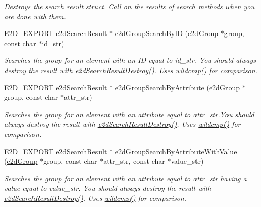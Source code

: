 \begin{DoxyCompactItemize}
\begin{DoxyCompactList}\small\item\em Destroys the search result struct. Call on the results of search methods when you are done with them. \end{DoxyCompactList}\item 
\hyperlink{Ez2DS_8h_a9f14e9cb869e1a85fdaba03afcca0df9}{E2\-D\-\_\-\-E\-X\-P\-O\-R\-T} \hyperlink{structe2dSearchResult}{e2d\-Search\-Result} $\ast$ \hyperlink{group__e2dGroup_ga0c495948b5e2e14d004d1daacf4811af}{e2d\-Group\-Search\-By\-I\-D} (\hyperlink{structe2dGroup}{e2d\-Group} $\ast$group, const char $\ast$id\-\_\-str)
\begin{DoxyCompactList}\small\item\em Searches the group for an element with an I\-D equal to id\-\_\-str. You should always destroy the result with \hyperlink{group__e2dGroup_ga0775c9a7e2ec5311263f84339afb52bc}{e2d\-Search\-Result\-Destroy()}. Uses \hyperlink{Ez2DS_8h_a64615e3e2147eb59622dbbe4f7af2e5f}{wildcmp()} for comparison. \end{DoxyCompactList}\item 
\hyperlink{Ez2DS_8h_a9f14e9cb869e1a85fdaba03afcca0df9}{E2\-D\-\_\-\-E\-X\-P\-O\-R\-T} \hyperlink{structe2dSearchResult}{e2d\-Search\-Result} $\ast$ \hyperlink{group__e2dGroup_gab4ce5d4021112416fecd57eea234dfc9}{e2d\-Group\-Search\-By\-Attribute} (\hyperlink{structe2dGroup}{e2d\-Group} $\ast$group, const char $\ast$attr\-\_\-str)
\begin{DoxyCompactList}\small\item\em Searches the group for an element with an attribute equal to attr\-\_\-str.\-You should always destroy the result with \hyperlink{group__e2dGroup_ga0775c9a7e2ec5311263f84339afb52bc}{e2d\-Search\-Result\-Destroy()}. Uses \hyperlink{Ez2DS_8h_a64615e3e2147eb59622dbbe4f7af2e5f}{wildcmp()} for comparison. \end{DoxyCompactList}\item 
\hyperlink{Ez2DS_8h_a9f14e9cb869e1a85fdaba03afcca0df9}{E2\-D\-\_\-\-E\-X\-P\-O\-R\-T} \hyperlink{structe2dSearchResult}{e2d\-Search\-Result} $\ast$ \hyperlink{group__e2dGroup_ga7f7a0b0f0538109d19b8d52cf96a1cea}{e2d\-Group\-Search\-By\-Attribute\-With\-Value} (\hyperlink{structe2dGroup}{e2d\-Group} $\ast$group, const char $\ast$attr\-\_\-str, const char $\ast$value\-\_\-str)
\begin{DoxyCompactList}\small\item\em Searches the group for an element with an attribute equal to attr\-\_\-str having a value equal to value\-\_\-str. You should always destroy the result with \hyperlink{group__e2dGroup_ga0775c9a7e2ec5311263f84339afb52bc}{e2d\-Search\-Result\-Destroy()}. Uses \hyperlink{Ez2DS_8h_a64615e3e2147eb59622dbbe4f7af2e5f}{wildcmp()} for comparison. \end{DoxyCompactList}\item 

\end{DoxyCompactItemize}
